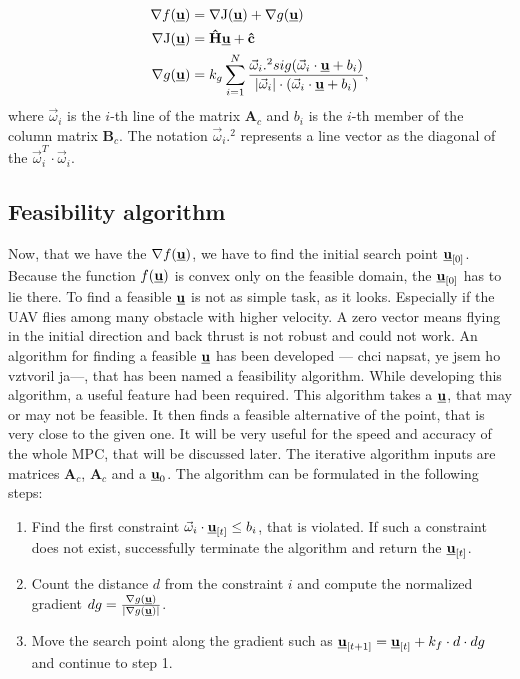 \documentclass[a4paper,11pt,titlepage]{article}
\newcommand{\uvec}{\textbf{\underline{u}}}
\newcommand{\macJ}{\mathrm{J}(\uvec)}
\newcommand{\macf}{f(\uvec)}
\newcommand{\macg}{g(\uvec)}
\newcommand{\macoi}{\vec{\omega}_i}
\begin{document}
\begin{equation}
\begin{split}
\nabla \macf &= \nabla \macJ + \nabla \macg\\
\nabla\macJ &= \textbf{\^H}\uvec + \textbf{\^c}\\
\nabla \macg &= k_g\sum_{i = 1}^N
\frac{\macoi.^2sig(\macoi\cdot\uvec+b_i)}
{|\macoi|\cdot(\macoi \cdot \uvec + b_i)},
\end{split}
\end{equation}
where $\macoi$ is the $i$-th line of the matrix $\textbf{A}_c$ and $b_i$ is the $i$-th member of the column matrix $\textbf{B}_c$. The notation $\macoi.^2$ represents a line vector as the diagonal of the $\macoi^T \cdot \macoi$. 

\subsection{Feasibility algorithm}
Now, that we have the $\nabla \macf$, we have to find the initial search point $\uvec_{[0]}$. Because the function $\macf$ is convex only on the feasible domain, the $\uvec_{[0]}$ has to lie there. To find a feasible $\uvec$ is not as simple task, as it looks. Especially if the UAV flies among many obstacle with higher velocity. A zero vector means flying in the initial direction and back thrust is not robust and could not work. An algorithm for finding a feasible $\uvec$ has been developed --- chci napsat, ye jsem ho vztvoril ja---, that has been named a feasibility algorithm. While developing this algorithm, a useful feature had been required. This algorithm takes a $\uvec$, that may or may not be feasible. It then finds a feasible alternative of the point, that is very close to the given one. It will be very useful for the speed and accuracy of the whole MPC, that will be discussed later. The iterative algorithm inputs are matrices $\textbf{A}_c$, $\textbf{A}_c$ and a $\uvec_0$. The algorithm can be formulated in the following steps:

\begin{enumerate}
\item Find the first constraint $\macoi \cdot \uvec_{[t]} \leq b_i$, that is violated. If such a constraint does not exist, successfully terminate the algorithm and return the $\uvec_{[t]}$.

\item Count the distance $d$ from the constraint $i$ and compute the normalized gradient $dg = \frac{\nabla \macg}{|\nabla \macg|}$.

\item Move the search point along the gradient such as $\uvec_{[t+1]} = \uvec_{[t]} + k_f \cdot d \cdot dg$ and continue to step 1.
\end{enumerate}
\end{document}
